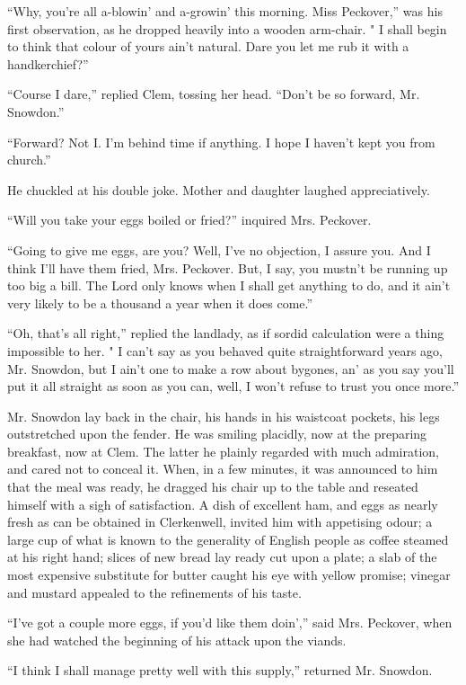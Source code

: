 ``Why, you're all a-blowin' and a-growin' this morning. Miss Peckover,''
was his first observation, as he dropped heavily into a {}wooden
arm-chair. " I shall begin to think that colour of yours ain't natural.
Dare you let me rub it with a handkerchief?''

``Course I dare,'' replied Clem, tossing her head. ``Don't be so
forward, Mr. Snowdon.''

``Forward? Not I. I'm behind time if anything. I hope I haven't kept you
from church.''

He chuckled at his double joke. Mother and daughter laughed
appreciatively.

``Will you take your eggs boiled or fried?'' inquired Mrs. Peckover.

``Going to give me eggs, are you? Well, I've no objection, I assure you.
And I think I'll have them fried, Mrs. Peckover. But, I say, you mustn't
be running up too big a bill. The Lord only knows when I shall get
anything to do, and it ain't very likely to be a thousand a year when it
does come.''

``Oh, that's all right,'' replied the landlady, as if sordid calculation
were a thing impossible to her. " I can't say as you behaved quite
straightforward years ago, Mr. Snowdon, but I ain't one to make a row
about bygones, {}an' as you say you'll put it all straight as soon as
you can, well, I won't refuse to trust you once more.''

Mr. Snowdon lay back in the chair, his hands in his waistcoat pockets,
his legs outstretched upon the fender. He was smiling placidly, now at
the preparing breakfast, now at Clem. The latter he plainly regarded
with much admiration, and cared not to conceal it. When, in a few
minutes, it was announced to him that the meal was ready, he dragged his
chair up to the table and reseated himself with a sigh of satisfaction.
A dish of excellent ham, and eggs as nearly fresh as can be obtained in
Clerkenwell, invited him with appetising odour; a large cup of what is
known to the generality of English people as coffee steamed at his right
hand; slices of new bread lay ready cut upon a plate; a slab of the most
expensive substitute for butter caught his eye with yellow promise;
vinegar and mustard appealed to the refinements of his taste.

``I've got a couple more eggs, if you'd like {}them doin','' said Mrs.
Peckover, when she had watched the beginning of his attack upon the
viands.

``I think I shall manage pretty well with this supply,'' returned Mr.
Snowdon.

